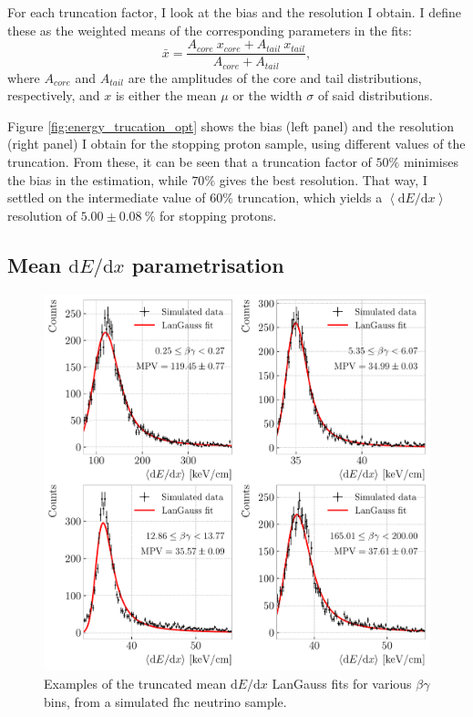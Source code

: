 For each truncation factor, I look at the bias and the resolution I obtain. I define these as the weighted means of the corresponding parameters in the fits:
\begin{equation}\label{eq:weighted_par_double_gauss}
	\bar{x} = \frac{A_{core}~x_{core}+A_{tail}~x_{tail}}{A_{core}+A_{tail}},
\end{equation}
where $A_{core}$ and $A_{tail}$ are the amplitudes of the core and tail distributions, respectively, and $x$ is either the mean $\mu$ or the width $\sigma$ of said distributions.

Figure \ref{fig:energy_trucation_opt} shows the bias (left panel) and the resolution (right panel) I obtain for the stopping proton sample, using different values of the truncation. From these, it can be seen that a truncation factor of $50\%$ minimises the bias in the estimation, while $70\%$ gives the best resolution. That way, I settled on the intermediate value of $60\%$ truncation, which yields a $\left<\mathrm{d}E/\mathrm{d}x\right>$ resolution of $5.00\pm0.08~\%$ for stopping protons.

\subsection[Mean \texorpdfstring{$\mathrm{d}E/\mathrm{d}x$}{dE/dx} parametrisation]{Mean \boldmath\texorpdfstring{$\mathrm{d}E/\mathrm{d}x$}{dE/dx} parametrisation} \label{subsec:dEdx_parametrisation}

\begin{figure}[t]
	\centering
	\includegraphics[width=.85\linewidth]{Images/GArSoft_PID/dEdx/dEdx_betagamma_examples.pdf}
	\caption[Examples of the truncated mean $\mathrm{d}E/\mathrm{d}x$ LanGauss fits for various $\beta\gamma$ bins, from a simulated \gls{fhc} neutrino sample.]{Examples of the truncated mean $\mathrm{d}E/\mathrm{d}x$ LanGauss fits for various $\beta\gamma$ bins, from a simulated \gls{fhc} neutrino sample.}
	\label{fig:dEdx_betagamma_fits}
\end{figure}

